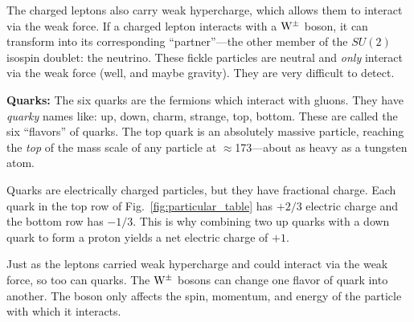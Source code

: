 The charged leptons also carry weak hypercharge, which allows them to interact via the weak force. 
If a charged lepton interacts with a $\mathrm{W}^\pm$ boson, it can transform into its corresponding ``partner''---the other member of the $SU(2)$ isospin doublet: the neutrino.
These fickle particles are neutral and \emph{only} interact via the weak force (well, and maybe gravity). 
They are very difficult to detect.



{\bf Quarks:}
The six quarks are the fermions which interact with gluons.
They have \emph{quarky} names like: 
up, down, charm, strange, top, bottom. 
These are called the six ``flavors'' of quarks.
The top quark is an absolutely massive particle, reaching the \emph{top} of the mass scale of any particle at $\approx$173\GeV---about as heavy as a tungsten atom.

Quarks are electrically charged particles, but they have fractional charge.
Each quark in the top row of Fig.~\ref{fig:particular_table} has $+2/3$ electric charge and the bottom row has $-1/3$.
This is why combining two up quarks with a down quark to form a proton yields a net electric charge of $+1$.

Just as the leptons carried weak hypercharge and could interact via the weak force, so too can quarks. 
The $\mathrm{W}^{\pm}$ bosons can change one flavor of quark into another.
The \PZ boson only affects the spin, momentum, and energy of the particle with which it interacts.


